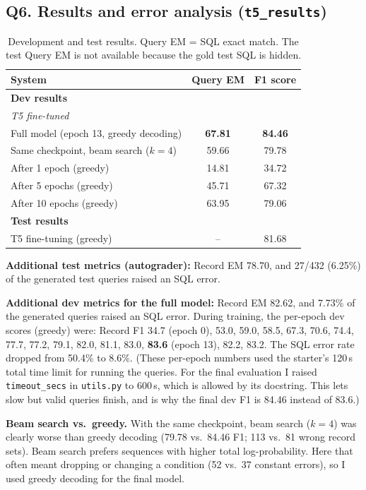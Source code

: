 \documentclass[11pt]{article}
\begin{document}
\subsection{Q6. Results and error analysis (\texttt{t5\_results})}

\begin{table}[H]
\centering
\begin{tabular}{lcc}
\toprule
System & Query EM & F1 score \\
\midrule
\multicolumn{3}{l}{\textbf{Dev results}} \\
\multicolumn{3}{l}{\textit{T5 fine-tuned}} \\
\quad Full model (epoch 13, greedy decoding) & \textbf{67.81} & \textbf{84.46} \\
\quad Same checkpoint, beam search ($k=4$) & 59.66 & 79.78 \\
\quad After 1 epoch (greedy) & 14.81 & 34.72 \\
\quad After 5 epochs (greedy) & 45.71 & 67.32 \\
\quad After 10 epochs (greedy) & 63.95 & 79.06 \\
\midrule
\multicolumn{3}{l}{\textbf{Test results}} \\
\quad T5 fine-tuning (greedy) & -- & 81.68 \\
\bottomrule
\end{tabular}
\caption{Development and test results. Query EM = SQL exact match. The test Query EM is not available because the
gold test SQL is hidden.}
\end{table}

\textbf{Additional test metrics (autograder):} Record EM 78.70, and 27/432 (6.25\%) of the generated test queries raised an
SQL error.

\textbf{Additional dev metrics for the full model:} Record EM 82.62, and 7.73\% of the generated queries raised an SQL
error. During training, the per-epoch dev scores (greedy) were: Record F1 34.7 (epoch 0), 53.0, 59.0, 58.5, 67.3,
70.6, 74.4, 77.7, 77.2, 79.1, 82.0, 81.1, 83.0, \textbf{83.6} (epoch 13), 82.2, 83.2. The SQL error rate dropped
from 50.4\% to 8.6\%. (These per-epoch numbers used the starter's 120\,s total time limit for running the queries.
For the final evaluation I raised \texttt{timeout\_secs} in \texttt{utils.py} to 600\,s, which is allowed by its
docstring. This lets slow but valid queries finish, and is why the final dev F1 is 84.46 instead of 83.6.)

\textbf{Beam search vs.\ greedy.} With the same checkpoint, beam search ($k=4$) was clearly worse than greedy decoding
(79.78 vs.\ 84.46 F1; 113 vs.\ 81 wrong record sets). Beam search prefers sequences with higher total
log-probability. Here that often meant dropping or changing a condition (52 vs.\ 37 constant errors), so I used
greedy decoding for the final model.
\end{document}
